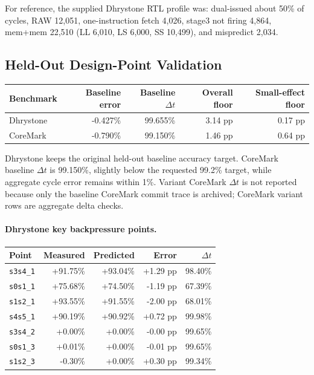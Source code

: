 \documentclass[10pt]{article}
\begin{document}
For reference, the supplied Dhrystone RTL profile was: dual-issued about 50\%
of cycles, RAW 12,051, one-instruction fetch 4,026, stage3 not firing 4,864,
mem+mem 22,510 (LL 6,010, LS 6,000, SS 10,499), and mispredict 2,034.

\subsection*{Held-Out Design-Point Validation}


\begin{tabular}{@{}lrrrr@{}}
\toprule
Benchmark & Baseline error & Baseline $\Delta t$ & Overall floor & Small-effect floor \\
\midrule
Dhrystone & -0.427\% & 99.655\% & 3.14 pp & 0.17 pp \\
CoreMark & -0.790\% & 99.150\% & 1.46 pp & 0.64 pp \\
\bottomrule
\end{tabular}

Dhrystone keeps the original held-out baseline accuracy target. CoreMark
baseline $\Delta t$ is 99.150\%, slightly below
the requested 99.2\% target, while aggregate cycle error remains within 1\%.
Variant CoreMark $\Delta t$ is not reported because only the baseline CoreMark
commit trace is archived; CoreMark variant rows are aggregate delta checks.


\paragraph{Dhrystone key backpressure points.}
\begin{tabular}{@{}lrrrr@{}}
\toprule
Point & Measured & Predicted & Error & $\Delta t$ \\
\midrule
\texttt{s3s4\_1} & +91.75\% & +93.04\% & +1.29 pp & 98.40\% \\
\texttt{s0s1\_1} & +75.68\% & +74.50\% & -1.19 pp & 67.39\% \\
\texttt{s1s2\_1} & +93.55\% & +91.55\% & -2.00 pp & 68.01\% \\
\texttt{s4s5\_1} & +90.19\% & +90.92\% & +0.72 pp & 99.98\% \\
\texttt{s3s4\_2} & +0.00\% & +0.00\% & -0.00 pp & 99.65\% \\
\texttt{s0s1\_3} & +0.01\% & +0.00\% & -0.01 pp & 99.65\% \\
\texttt{s1s2\_3} & -0.30\% & +0.00\% & +0.30 pp & 99.34\% \\
\bottomrule
\end{tabular}
\end{document}
